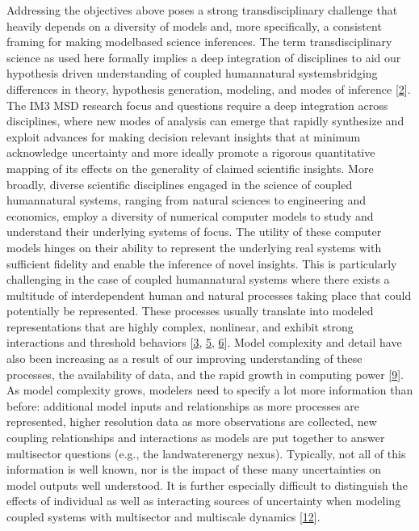\documentclass[letterpaper,10pt,english]{sphinxmanual}
\begin{document}
\sphinxAtStartPar
Addressing the objectives above poses a strong transdisciplinary challenge that heavily depends on a diversity of models and, more specifically, a consistent framing for making model\sphinxhyphen{}based science inferences. The term transdisciplinary science as used here formally implies a deep integration of disciplines to aid our hypothesis driven understanding of coupled human\sphinxhyphen{}natural systems\textendash{}bridging differences in theory, hypothesis generation, modeling, and modes of inference {[}\hyperlink{cite.index:id2}{2}{]}. The IM3 MSD research focus and questions require a deep integration across disciplines, where new modes of analysis can emerge that rapidly synthesize and exploit advances for making decision relevant insights that at minimum acknowledge uncertainty and more ideally promote a rigorous quantitative mapping of its effects on the generality of claimed scientific insights. More broadly, diverse scientific disciplines engaged in the science of coupled human\sphinxhyphen{}natural systems, ranging from natural sciences to engineering and economics, employ a diversity of numerical computer models to study and understand their underlying systems of focus. The utility of these computer models hinges on their ability to represent the underlying real systems with sufficient fidelity and enable the inference of novel insights. This is particularly challenging in the case of coupled human\sphinxhyphen{}natural systems where there exists a multitude of interdependent human and natural processes taking place that could potentially be represented. These processes usually translate into modeled representations that are highly complex, non\sphinxhyphen{}linear, and exhibit strong interactions and threshold behaviors {[}\hyperlink{cite.index:id3}{3}, \hyperlink{cite.index:id4}{5}, \hyperlink{cite.index:id5}{6}{]}. Model complexity and detail have also been increasing as a result of our improving understanding of these processes, the availability of data, and the rapid growth in computing power {[}\hyperlink{cite.index:id6}{9}{]}. As model complexity grows, modelers need to specify a lot more information than before: additional model inputs and relationships as more processes are represented, higher resolution data as more observations are collected, new coupling relationships and interactions as models are put together to answer multisector questions (e.g., the land\sphinxhyphen{}water\sphinxhyphen{}energy nexus). Typically, not all of this information is well known, nor is the impact of these many uncertainties on model outputs well understood. It is further especially difficult to distinguish the effects of individual as well as interacting sources of uncertainty when modeling coupled systems with multisector and multiscale dynamics {[}\hyperlink{cite.index:id7}{12}{]}.
\end{document}
